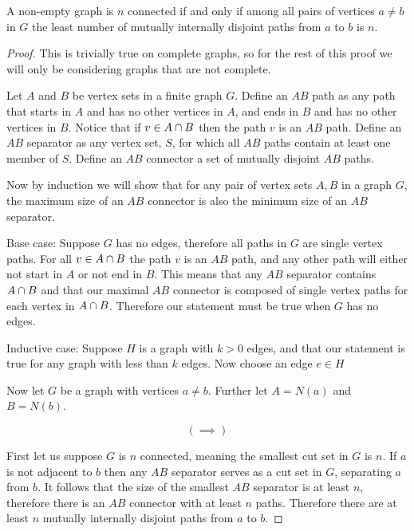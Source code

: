 \documentclass{article}
\begin{document}
\begin{theorem}
	A non-empty graph is $n$ connected if and only if among all pairs of vertices $a\not=b$ in $G$ the least number of mutually internally disjoint paths from $a$ to $b$ is $n$.
\end{theorem}
\begin{proof}
	This is trivially true on complete graphs, so for the rest of this proof we will only be considering graphs that are not complete.
	
	Let $A$ and $B$ be vertex sets in a finite graph $G$. Define an $AB$ path as any path that starts in $A$ and has no other vertices in $A$, and ends in $B$ and has no other vertices in $B$. Notice that if $v\in A\cap B$ then the path $v$ is an $AB$ path. Define an $AB$ separator as any vertex set, $S$, for which all $AB$ paths contain at least one member of $S$. Define an $AB$ connector a set of mutually disjoint $AB$ paths.
	
	Now by induction we will show that for any pair of vertex sets $A,B$ in a graph $G$, the maximum size of an $AB$ connector is also the minimum size of an $AB$ separator.
	
	Base case: Suppose $G$ has no edges, therefore all paths in $G$ are single vertex paths. For all $v \in A \cap B$ the path $v$ is an $AB$ path, and any other path will either not start in $A$ or not end in $B$. This means that any $AB$ separator contains $A\cap B$ and that our maximal $AB$ connector is composed of single vertex paths for each vertex in $A\cap B$. Therefore our statement must be true when $G$ has no edges.
	
	Inductive case: Suppose $H$ is a graph with $k>0$ edges, and that our statement is true for any graph with less than $k$ edges. Now choose an edge $e\in H$%
	
	Now let $G$ be a graph with vertices $a\not=b$. Further let $A = N(a)$ and $B = N(b)$. 
	
	$$(\implies)$$
	
	First let us suppose $G$ is $n$ connected, meaning the smallest cut set in $G$ is $n$. If $a$ is not adjacent to $b$ then any $AB$ separator serves as a cut set in $G$, separating $a$ from $b$. It follows that the size of the smallest $AB$ separator is at least $n$, therefore there is an $AB$ connector with at least $n$ paths. Therefore there are at least $n$ mutually internally disjoint paths from $a$ to $b$.
	

\end{proof}
\end{document}
